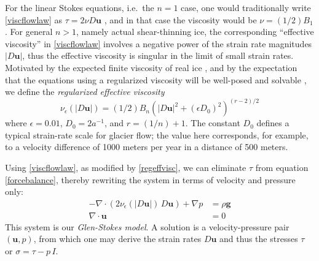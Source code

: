\documentclass[letterpaper,final,12pt,reqno]{amsart}
\newcommand{\eps}{\epsilon}
\newcommand{\Div}{\nabla\cdot}
\newcommand{\bu}{\mathbf{u}}
\begin{document}
For the linear Stokes equations, i.e.~the $n=1$ case, one would traditionally write \eqref{viscflowlaw} as $\tau = 2\nu D\bu$ \cite{Elmanetal2014}, and in that case the viscosity would be $\nu = (1/2) B_1$.  For general $n>1$, namely actual shear-thinning ice, the corresponding ``effective viscosity'' in \eqref{viscflowlaw} involves a negative power of the strain rate magnitudes $|D\bu|$, thus the effective viscosity is singular in the limit of small strain rates.  Motivated by the expected finite viscosity of real ice \cite{GreveBlatter2009}, and by the expectation that the equations using a regularized viscosity will be well-posed and solvable \cite{JouvetRappaz2011}, we define the \emph{regularized effective viscosity}
\begin{equation}
\nu_\eps(|D\bu|) = (1/2) B_n \left(|D\bu|^2 + (\eps D_0)^2\right)^{(r-2)/2} \label{regeffvisc}
\end{equation}
where $\eps = 0.01$, $D_0 = 2 a^{-1}$, and $r=(1/n)+1$.  The constant $D_0$ defines a typical strain-rate scale for glacier flow; the value here corresponds, for example, to a velocity difference of 1000 meters per year in a distance of 500 meters.

Using \eqref{viscflowlaw}, as modified by \eqref{regeffvisc}, we can eliminate $\tau$ from equation \eqref{forcebalance}, thereby rewriting the system in terms of velocity and pressure only:
\begin{align}
- \nabla \cdot \left(2 \nu_\eps(|D\bu|)\, D\bu\right) + \nabla p &= \rho \mathbf{g} \label{stokes} \\
\Div \bu &= 0 \label{incompagain}
\end{align}
This system is our \emph{Glen-Stokes model}.  A solution is a velocity-pressure pair $(\bu,p)$, from which one may derive the strain rates $D\bu$ and thus the stresses $\tau$ or $\sigma = \tau - p\,I$.
\end{document}
